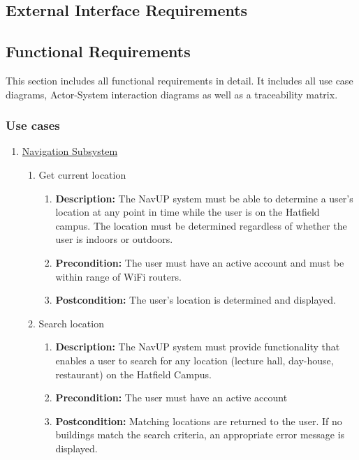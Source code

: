 \documentclass{article}
\begin{document}
	\subsection{External Interface Requirements}
	
	\subsection{Functional Requirements}
	This section includes all functional requirements in detail. It includes all use case diagrams, Actor-System interaction diagrams as well as a traceability matrix.	
	
	\subsubsection{Use cases}
	\begin{enumerate}
		\item \underline{Navigation Subsystem}
			
		
	\begin{enumerate}
		\item Get current location
		\begin{enumerate}
			\item \textbf{Description:} The NavUP system must be able to determine a user’s location at any point in time while the user is on the Hatfield campus. The location must be determined regardless of whether the user is indoors or outdoors.
			\item \textbf{Precondition:} The user must have an active account and must be within range of WiFi routers.
			\item \textbf{Postcondition:} The user’s location is determined and displayed.\newline
		\end{enumerate}
		
		\item Search location
		\begin{enumerate}
			\item \textbf{Description:} The NavUP system must provide functionality that enables a user to search for any location (lecture hall, day-house, restaurant) on the Hatfield Campus.
			\item \textbf{Precondition:} The user must have an active account
			\item \textbf{Postcondition:} Matching locations are returned to the user. If no buildings match the search criteria, an appropriate error message is displayed.\newline
		\end{enumerate}
		

\end{enumerate}
\end{enumerate}
\end{document}
